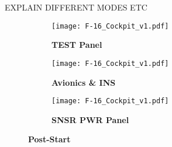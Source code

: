 \begin{tablenumerate}
{\begin{subenumerate}
        EXPLAIN DIFFERENT MODES ETC
    \end{subenumerate}}
\end{tablenumerate}

\begin{figure}[h]
    \centering
    \begin{subfigure}[t]{0.3\linewidth}
        \centering
        \texttt{[image: F-16\_Cockpit\_v1.pdf]}
        \caption*{\textbf{TEST Panel}}
    \end{subfigure}
    \begin{subfigure}[t]{0.3\linewidth}
        \centering
        \texttt{[image: F-16\_Cockpit\_v1.pdf]}
        \caption*{\textbf{Avionics \& INS}}
    \end{subfigure}
    \begin{subfigure}[t]{0.3\linewidth}
        \centering
        \texttt{[image: F-16\_Cockpit\_v1.pdf]}
        \caption*{\textbf{SNSR PWR Panel}}
    \end{subfigure}
    \caption{\textbf{Post-Start}}
    \label{fig:proc:poststart1}
\end{figure}

\clearpage 

